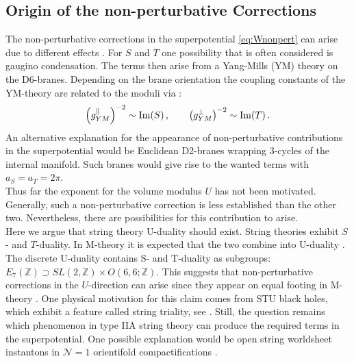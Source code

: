 \documentclass[a4paper,12pt,twoside,openright]{report}
\newcommand{\be}{\begin{equation}}
\newcommand{\ee}{\end{equation}}
\def\rmim{{\rm Im}}
\begin{document}
\subsection{Origin of the non-perturbative Corrections}
The non-perturbative corrections in the superpotential \ref{eq:Wnonpert} can arise due to different effects \cite{Palti:2008mg}. For $S$ and $T$ one possibility that is often considered is gaugino condensation. The terms then arise from a Yang-Mills (YM) theory on the D6-branes. Depending on the brane orientation the coupling constants of the YM-theory are related to the moduli via \cite{Danielsson:2013rza}:
\be
\left(g_{YM}^\parallel \right)^{-2} \sim \rmim (S)\,, \qquad \left(g_{YM}^\perp \right)^{-2} \sim \rmim (T)\,.
\ee
An alternative explanation for the appearance of non-perturbative contributions in the superpotential would be Euclidean D2-branes wrapping 3-cycles of the internal manifold. Such branes would give rise to the wanted terms with $a_S =a_T= 2\pi$.\\
Thus far the exponent for the volume modulus $U$ has not been motivated. Generally, such a non-perturbative correction is less established than the other two. Nevertheless, there are possibilities for this contribution to arise.\\
Here we argue that string theory U-duality should exist. String theories exhibit $S$- and $T$-duality. In M-theory it is expected that the two combine into U-duality \cite{Hull:1994ys,Schwarz:1996bh}. The discrete U-duality  contains S- and T-duality as subgroups: $E_7(\mathbb{Z}) \supset SL(2,\mathbb{Z}) \times O(6,6;\mathbb{Z})$. This suggests that non-perturbative corrections in the $U$-direction can arise since they appear on equal footing in M-theory \cite{Acharya:2007rc}. One physical motivation for this claim comes from STU black holes, which exhibit a feature called string triality, see \cite{Behrndt:1996hu}. Still, the question remains which phenomenon in type IIA string theory can produce the required terms in the superpotential. One possible explanation would be open  string worldsheet instantons in $\mathcal{N} = 1$ orientifold compactifications \cite{Kachru:2000ih,Blumenhagen:2009qh}.\\
\end{document}
